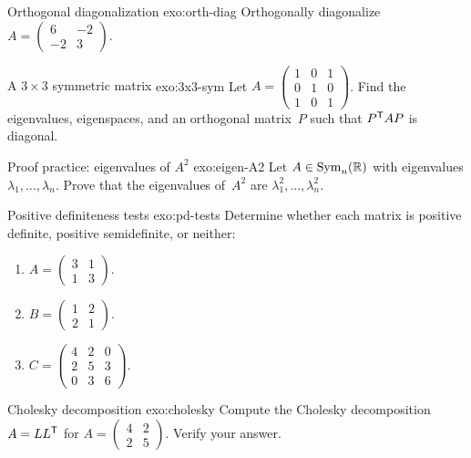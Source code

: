 \begin{exercise}{Orthogonal diagonalization \basic}{exo:orth-diag}
Orthogonally diagonalize
$A = \begin{pmatrix} 6 & -2 \\ -2 & 3 \end{pmatrix}$.
\end{exercise}

\begin{exercise}{A $3\times 3$ symmetric matrix \basic}{exo:3x3-sym}
Let $A = \begin{pmatrix} 1 & 0 & 1 \\ 0 & 1 & 0 \\ 1 & 0 & 1\end{pmatrix}$.
Find the eigenvalues, eigenspaces, and an orthogonal matrix~$P$ such that
${P}^{\mathsf{T}}AP$ is diagonal.
\end{exercise}

\begin{exercise}{Proof practice: eigenvalues of $A^2$ \basic}{exo:eigen-A2}
Let $A\in\operatorname{Sym}_n({\mathbb{R}})$ with eigenvalues $\lambda_1,\ldots,\lambda_n$.
Prove that the eigenvalues of~$A^2$ are $\lambda_1^2,\ldots,\lambda_n^2$.
\end{exercise}

\begin{exercise}{Positive definiteness tests \intermediate}{exo:pd-tests}
Determine whether each matrix is positive definite, positive semidefinite,
or neither:
\begin{enumerate}[label=\textup{(\alph*)}]
  \item $A = \begin{pmatrix} 3 & 1 \\ 1 & 3 \end{pmatrix}$.
  \item $B = \begin{pmatrix} 1 & 2 \\ 2 & 1 \end{pmatrix}$.
  \item $C = \begin{pmatrix} 4 & 2 & 0 \\ 2 & 5 & 3 \\ 0 & 3 & 6
    \end{pmatrix}$.
\end{enumerate}
\end{exercise}

\begin{exercise}{Cholesky decomposition \intermediate}{exo:cholesky}
Compute the Cholesky decomposition $A = L{L}^{\mathsf{T}}$ for
$A = \begin{pmatrix} 4 & 2 \\ 2 & 5 \end{pmatrix}$.
Verify your answer.
\end{exercise}

